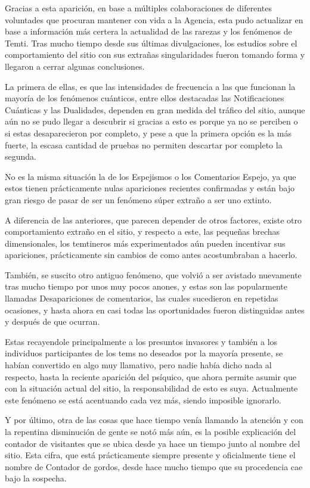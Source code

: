 \documentclass[
  spanish,
]{book}
\begin{document}
Gracias a esta aparición, en base a múltiples colaboraciones de diferentes voluntades que procuran mantener con vida a la Agencia, esta pudo actualizar en base a información más certera la actualidad de las rarezas y los fenómenos de Temti. Tras mucho tiempo desde sus últimas divulgaciones, los estudios sobre el comportamiento del sitio con sus extrañas singularidades fueron tomando forma y llegaron a cerrar algunas conclusiones.

La primera de ellas, es que las intensidades de frecuencia a las que funcionan la mayoría de los fenómenos cuánticos, entre ellos destacadas las Notificaciones Cuánticas y las Dualidades, dependen en gran medida del tráfico del sitio, aunque aún no se pudo llegar a descubrir si gracias a esto es porque ya no se perciben o si estas desaparecieron por completo, y pese a que la primera opción es la más fuerte, la escasa cantidad de pruebas no permiten descartar por completo la segunda.

No es la misma situación la de los Espejismos o los Comentarios Espejo, ya que estos tienen prácticamente nulas apariciones recientes confirmadas y están bajo gran riesgo de pasar de ser un fenómeno súper extraño a ser uno extinto.

A diferencia de las anteriores, que parecen depender de otros factores, existe otro comportamiento extraño en el sitio, y respecto a este, las pequeñas brechas dimensionales, los temtineros más experimentados aún pueden incentivar sus apariciones, prácticamente sin cambios de como antes acostumbraban a hacerlo.

También, se suscito otro antiguo fenómeno, que volvió a ser avistado nuevamente tras mucho tiempo por unos muy pocos anones, y estas son las popularmente llamadas Desapariciones de comentarios, las cuales sucedieron en repetidas ocasiones, y hasta ahora en casi todas las oportunidades fueron distinguidas antes y después de que ocurran.

Estas recayendole principalmente a los presuntos invasores y también a los individuos participantes de los tems no deseados por la mayoría presente, se habían convertido en algo muy llamativo, pero nadie había dicho nada al respecto, hasta la reciente aparición del psíquico, que ahora permite asumir que con la situación actual del sitio, la responsabilidad de esto es suya. Actualmente este fenómeno se está acentuando cada vez más, siendo imposible ignorarlo.

Y por último, otra de las cosas que hace tiempo venía llamando la atención y con la repentina disminución de gente se notó más aún, es la posible explicación del contador de visitantes que se ubica desde ya hace un tiempo junto al nombre del sitio. Esta cifra, que está prácticamente siempre presente y oficialmente tiene el nombre de Contador de gordos, desde hace mucho tiempo que su procedencia cae bajo la sospecha.
\end{document}

